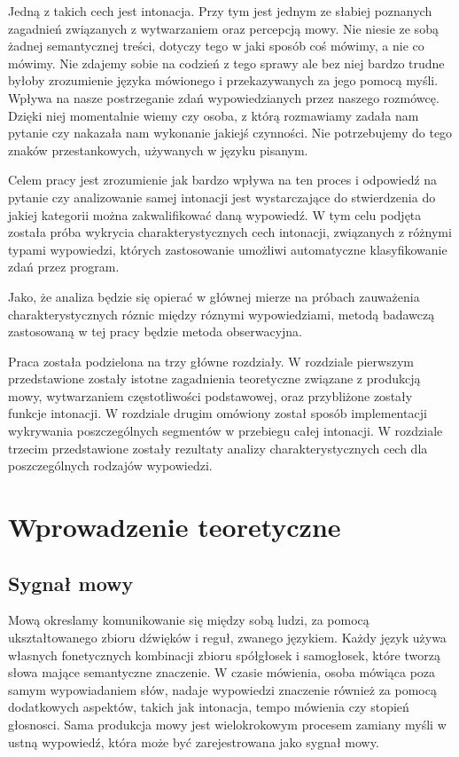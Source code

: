 \documentclass[a4paper,12 pt]{report}
\begin{document}
Jedną z takich cech jest intonacja. Przy tym jest jednym ze słabiej poznanych zagadnień związanych z wytwarzaniem oraz percepcją mowy. Nie niesie ze sobą żadnej semantycznej treści, dotyczy tego w jaki sposób coś mówimy, a nie co mówimy. Nie zdajemy sobie na codzień z tego sprawy ale bez niej bardzo trudne byłoby zrozumienie języka mówionego i przekazywanych za jego pomocą myśli. Wpływa na nasze postrzeganie zdań wypowiedzianych przez naszego rozmówcę. Dzięki niej momentalnie wiemy czy osoba, z którą rozmawiamy zadała nam pytanie czy nakazała nam wykonanie jakiejś czynności. Nie potrzebujemy do tego znaków przestankowych, używanych w języku pisanym.

Celem pracy jest zrozumienie jak bardzo wpływa na ten proces i odpowiedź na pytanie czy analizowanie samej intonacji jest wystarczające do stwierdzenia do jakiej kategorii można zakwalifikować daną wypowiedź. W tym celu podjęta została próba wykrycia charakterystycznych cech intonacji, związanych z różnymi typami wypowiedzi, których zastosowanie umożliwi automatyczne klasyfikowanie zdań przez program.

Jako, że analiza będzie się opierać w głównej mierze na próbach zauważenia charakterystycznych róznic między róznymi wypowiedziami, metodą badawczą zastosowaną w tej pracy będzie metoda obserwacyjna.

Praca została podzielona na trzy główne rozdziały.
W rozdziale pierwszym przedstawione zostały istotne zagadnienia teoretyczne związane z produkcją mowy, wytwarzaniem częstotliwości podstawowej,
oraz przybliżone zostały funkcje intonacji. W rozdziale drugim omówiony został sposób implementacji wykrywania poszczególnych segmentów w przebiegu całej intonacji. W rozdziale trzecim przedstawione zostały rezultaty analizy charakterystycznych cech dla poszczególnych rodzajów wypowiedzi.
\newpage
\chapter{Wprowadzenie teoretyczne}

\section{Sygnał mowy}
Mową okreslamy komunikowanie się między sobą ludzi, za pomocą ukształtowanego zbioru dźwięków i reguł, zwanego językiem. Każdy język używa własnych fonetycznych kombinacji zbioru spółgłosek i samogłosek, które tworzą słowa mające semantyczne znaczenie. W czasie mówienia, osoba mówiąca poza samym wypowiadaniem słów, nadaje wypowiedzi znaczenie również za pomocą dodatkowych aspektów, takich jak intonacja, tempo mówienia czy stopień głosnosci.
Sama produkcja mowy jest wielokrokowym procesem zamiany myśli w ustną wypowiedź, która może być zarejestrowana jako sygnał mowy.
\end{document}
